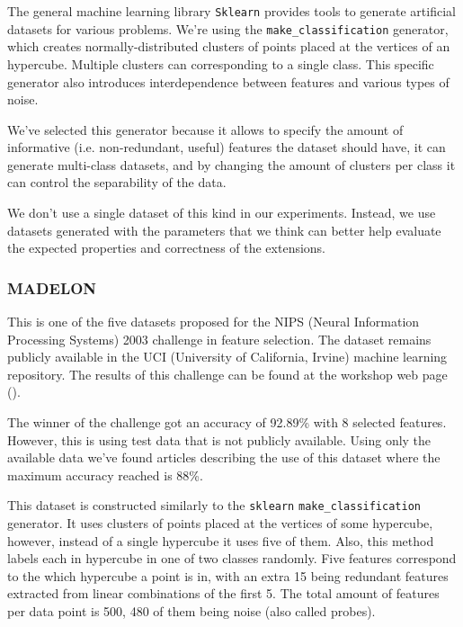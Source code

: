 The general machine learning library \texttt{Sklearn} provides tools to generate artificial datasets for various prob\-lems. We're using the \texttt{make\_classification} gen\-er\-a\-tor, which creates normally-distributed clus\-ters of points placed at the vertices of an hypercube. Multiple clusters can corresponding to a single class. This specific gen\-er\-a\-tor also introduces in\-ter\-de\-pen\-dence between features and var\-i\-ous types of noise.

We've selected this generator because it allows to specify the amount of in\-for\-ma\-tive (i.e. non-redundant, useful) features the dataset should have, it can generate multi-class datasets, and by changing the amount of clusters per class it can control the separability of the data.

We don't use a single dataset of this kind in our experiments. Instead, we use datasets generated with the parameters that we think can better help evaluate the expected properties and correctness of the extensions.

\subsubsection*{MADELON}
\label{sec:ch5.data.madelon}

This is one of the five datasets proposed for the NIPS (Neural Information Processing Systems) 2003 challenge in feature selection. The dataset remains publicly available in the UCI (University of California, Irvine) machine learning repository. The results of this challenge can be found at the workshop web page (\cite{guyon_result_2004}).

The winner of the challenge got an accuracy of 92.89\% with 8 selected features. However, this is using test data that is not publicly available. Using only the avail\-able data we've found articles describing the use of this dataset where the maximum accuracy reached is 88\%. 

This dataset is constructed similarly to the \texttt{sklearn} \texttt{make\_classification} gen\-er\-a\-tor. It uses clusters of points placed at the vertices of some hypercube, however, instead of a single hypercube it uses five of them. Also, this method labels each in hypercube in one of two classes randomly. Five features correspond to the which hypercube a point is in, with an extra 15 being redundant features extracted from linear combinations of the first 5. The total amount of features per data point is 500, 480 of them being noise (also called probes).

